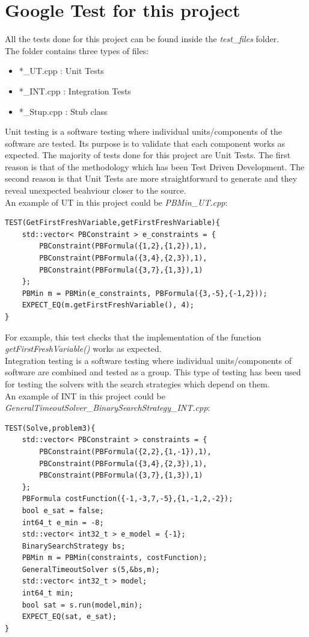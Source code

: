 \section{Google Test for this project}
All the tests done for this project can be found inside the \emph{test\_files} folder.\\
The folder contains three types of files:
\begin{itemize}
	\item *\_UT.cpp : Unit Tests
	\item *\_INT.cpp : Integration Tests
	\item *\_Stup.cpp : Stub class
\end{itemize}
Unit testing is a software testing where individual units/components of the software are tested. Its purpose is to validate that each component works as expected. The majority of tests done for this project are Unit Tests. The first reason is that of the methodology which has been Test Driven Development. The second reason is that Unit Tests are more straightforward to generate and they reveal unexpected beahviour closer to the source.\\
An example of UT in this project could be \emph{PBMin\_UT.cpp}:
\begin{verbatim}
TEST(GetFirstFreshVariable,getFirstFreshVariable){
    std::vector< PBConstraint > e_constraints = {
        PBConstraint(PBFormula({1,2},{1,2}),1),
        PBConstraint(PBFormula({3,4},{2,3}),1),
        PBConstraint(PBFormula({3,7},{1,3}),1)
    };
    PBMin m = PBMin(e_constraints, PBFormula({3,-5},{-1,2}));
    EXPECT_EQ(m.getFirstFreshVariable(), 4);
}
\end{verbatim}
For example, this test checks that the implementation of the function \emph{getFirstFreshVariable()} works as expected.\\
Integration testing is a software testing where individual units/components of software are combined and tested as a group. This type of testing has been used for testing the solvers with the search strategies which depend on them.\\
An example of INT in this project could be \emph{GeneralTimeoutSolver\_BinarySearchStrategy\_INT.cpp}:
\begin{verbatim}
TEST(Solve,problem3){
    std::vector< PBConstraint > constraints = {
        PBConstraint(PBFormula({2,2},{1,-1}),1),
        PBConstraint(PBFormula({3,4},{2,3}),1),
        PBConstraint(PBFormula({3,7},{1,3}),1)
    };
    PBFormula costFunction({-1,-3,7,-5},{1,-1,2,-2});
    bool e_sat = false;
    int64_t e_min = -8;
    std::vector< int32_t > e_model = {-1};
    BinarySearchStrategy bs;
    PBMin m = PBMin(constraints, costFunction);
    GeneralTimeoutSolver s(5,&bs,m);
    std::vector< int32_t > model;
    int64_t min;
    bool sat = s.run(model,min);
    EXPECT_EQ(sat, e_sat);
}
\end{verbatim}
